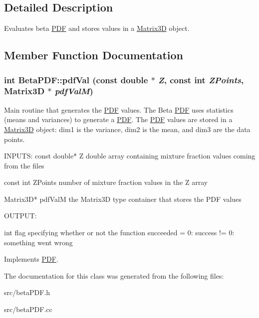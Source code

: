 \subsection{Detailed Description}
Evaluates beta \hyperlink{classPDF}{PDF} and stores values in a \hyperlink{classMatrix3D}{Matrix3D} object. 

\subsection{Member Function Documentation}
\hypertarget{classBetaPDF_a5c27da056f9c9b17af0888fac7df2c9f}{
\subsubsection[{pdfVal}]{\setlength{\rightskip}{0pt plus 5cm}int BetaPDF::pdfVal (const double $\ast$ {\em Z}, \/  const int {\em ZPoints}, \/  {\bf Matrix3D} $\ast$ {\em pdfValM})}}
\label{de/d4f/classBetaPDF_a5c27da056f9c9b17af0888fac7df2c9f}


Main routine that generates the \hyperlink{classPDF}{PDF} values. The Beta \hyperlink{classPDF}{PDF} uses statistics (means and variances) to generate a \hyperlink{classPDF}{PDF}. The \hyperlink{classPDF}{PDF} values are stored in a \hyperlink{classMatrix3D}{Matrix3D} object: dim1 is the variance, dim2 is the mean, and dim3 are the data points.

\begin{DoxyVerb}

  INPUTS: 
  const double* Z        double array containing mixture fraction values coming from the files

  const int ZPoints      number of mixture fraction values in the Z array

  Matrix3D* pdfValM      the Matrix3D type container that stores the PDF values

  
  OUTPUT:

  int                    flag specifying whether or not the function succeeded
                          = 0: success
			 != 0: something went wrong

  \end{DoxyVerb}
 

Implements \hyperlink{classPDF}{PDF}.

The documentation for this class was generated from the following files:\begin{DoxyCompactItemize}
\item 
src/betaPDF.h\item 
src/betaPDF.cc\end{DoxyCompactItemize}
